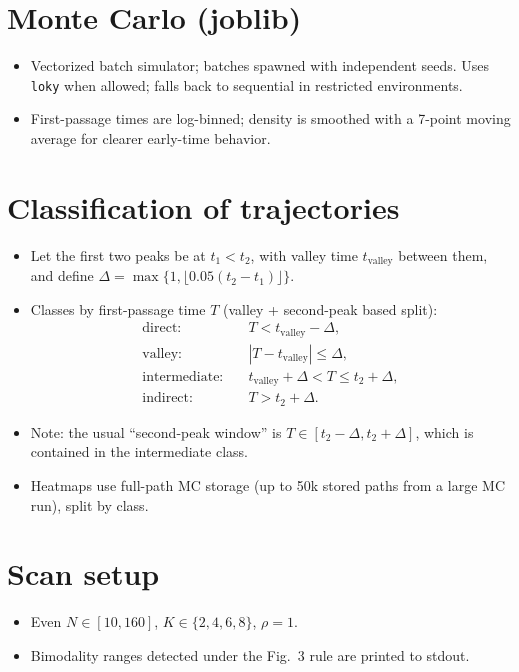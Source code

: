\documentclass[11pt]{article}
\begin{document}
\section{Monte Carlo (joblib)}
\begin{itemize}
  \item Vectorized batch simulator; batches spawned with independent seeds. Uses \texttt{loky} when allowed; falls back to sequential in restricted environments.
  \item First-passage times are log-binned; density is smoothed with a 7-point moving average for clearer early-time behavior.
\end{itemize}

\section{Classification of trajectories}
\begin{itemize}
  \item Let the first two peaks be at $t_1<t_2$, with valley time $t_{\mathrm{valley}}$ between them, and define $\Delta = \max\{1,\lfloor 0.05 (t_2-t_1)\rfloor\}$.
  \item Classes by first-passage time $T$ (valley + second-peak based split):
  \[
  \begin{aligned}
    \text{direct:}\quad & T < t_{\mathrm{valley}}-\Delta,\\
    \text{valley:}\quad & |T-t_{\mathrm{valley}}|\le \Delta,\\
    \text{intermediate:}\quad & t_{\mathrm{valley}}+\Delta < T \le t_{2}+\Delta,\\
    \text{indirect:}\quad & T > t_{2}+\Delta.
  \end{aligned}
  \]
  \item Note: the usual ``second-peak window'' is $T\in[t_2-\Delta,t_2+\Delta]$, which is contained in the intermediate class.
  \item Heatmaps use full-path MC storage (up to 50k stored paths from a large MC run), split by class.
\end{itemize}

\section{Scan setup}
\begin{itemize}
  \item Even $N\in[10,160]$, $K\in\{2,4,6,8\}$, $\rho=1$.
  \item Bimodality ranges detected under the Fig.~3 rule are printed to stdout.
\end{itemize}
\end{document}

